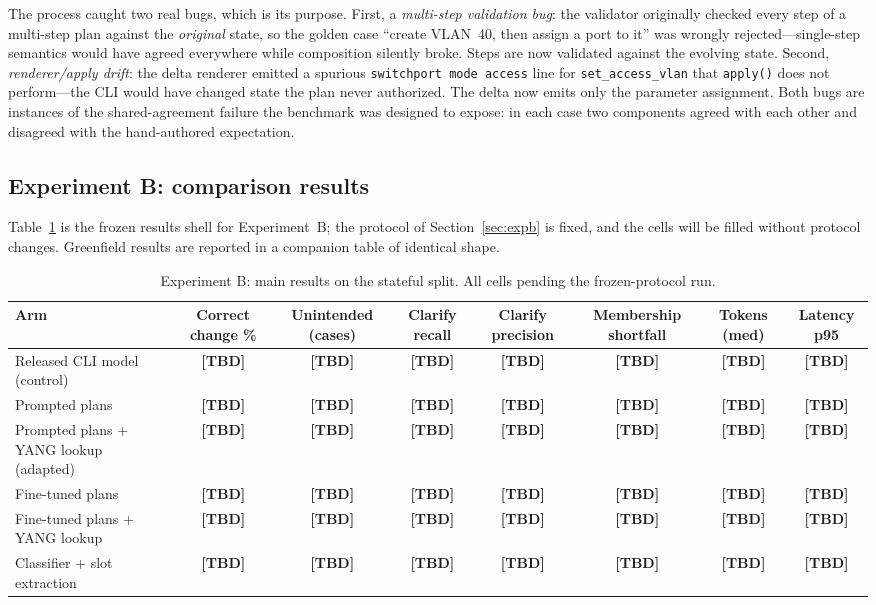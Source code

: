 \documentclass[conference]{IEEEtran}
\newcommand{\tbd}{\textbf{[TBD]}}
\begin{document}
The process caught two real bugs, which is its purpose. First, a \emph{multi-step validation bug}: the validator originally checked every step of a multi-step plan against the \emph{original} state, so the golden case ``create VLAN~40, then assign a port to it'' was wrongly rejected---single-step semantics would have agreed everywhere while composition silently broke. Steps are now validated against the evolving state. Second, \emph{renderer/apply drift}: the delta renderer emitted a spurious \texttt{switchport mode access} line for \texttt{set\_access\_vlan} that \texttt{apply()} does not perform---the CLI would have changed state the plan never authorized. The delta now emits only the parameter assignment. Both bugs are instances of the shared-agreement failure the benchmark was designed to expose: in each case two components agreed with each other and disagreed with the hand-authored expectation.

\subsection{Experiment B: comparison results}

Table~\ref{tab:expb} is the frozen results shell for Experiment~B; the protocol of Section~\ref{sec:expb} is fixed, and the cells will be filled without protocol changes. Greenfield results are reported in a companion table of identical shape.

\begin{table}[t]
\centering
\caption{Experiment B: main results on the stateful split. All cells pending the frozen-protocol run.}
\label{tab:expb}
\small
\begin{tabular}{@{}lccccccc@{}}
\toprule
\textbf{Arm} & \textbf{Correct change \%} & \textbf{Unintended (cases)} & \textbf{Clarify recall} & \textbf{Clarify precision} & \textbf{Membership shortfall} & \textbf{Tokens (med)} & \textbf{Latency p95} \\
\midrule
Released CLI model (control) & \tbd & \tbd & \tbd & \tbd & \tbd & \tbd & \tbd \\
Prompted plans & \tbd & \tbd & \tbd & \tbd & \tbd & \tbd & \tbd \\
Prompted plans + YANG lookup (adapted) & \tbd & \tbd & \tbd & \tbd & \tbd & \tbd & \tbd \\
Fine-tuned plans & \tbd & \tbd & \tbd & \tbd & \tbd & \tbd & \tbd \\
Fine-tuned plans + YANG lookup & \tbd & \tbd & \tbd & \tbd & \tbd & \tbd & \tbd \\
Classifier + slot extraction & \tbd & \tbd & \tbd & \tbd & \tbd & \tbd & \tbd \\
\bottomrule
\end{tabular}
\end{table}
\end{document}
